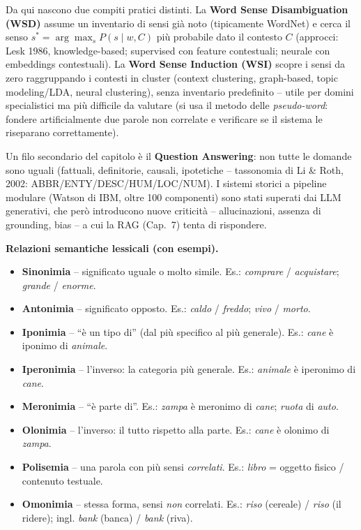 \documentclass[11pt,a4paper]{article}
\begin{document}
Da qui nascono due compiti pratici distinti. La \textbf{Word Sense Disambiguation (WSD)} assume un inventario di sensi gi\`a noto (tipicamente WordNet) e cerca il senso $s^*=\arg\max_s P(s\mid w,C)$ pi\`u probabile dato il contesto $C$ (approcci: Lesk 1986, knowledge-based; supervised con feature contestuali; neurale con embeddings contestuali). La \textbf{Word Sense Induction (WSI)} scopre i sensi da zero raggruppando i contesti in cluster (context clustering, graph-based, topic modeling/LDA, neural clustering), senza inventario predefinito -- utile per domini specialistici ma pi\`u difficile da valutare (si usa il metodo delle \emph{pseudo-word}: fondere artificialmente due parole non correlate e verificare se il sistema le riseparano correttamente).

Un filo secondario del capitolo \`e il \textbf{Question Answering}: non tutte le domande sono uguali (fattuali, definitorie, causali, ipotetiche -- tassonomia di Li \& Roth, 2002: ABBR/ENTY/DESC/HUM/LOC/NUM). I sistemi storici a pipeline modulare (Watson di IBM, oltre 100 componenti) sono stati superati dai LLM generativi, che per\`o introducono nuove criticit\`a -- allucinazioni, assenza di grounding, bias -- a cui la RAG (Cap.~7) tenta di rispondere.

\medskip\noindent\textbf{\textcolor{blue!45!black}{Relazioni semantiche lessicali (con esempi).}}
\begin{itemize}
\item \textbf{Sinonimia} -- significato uguale o molto simile. Es.: \emph{comprare} / \emph{acquistare}; \emph{grande} / \emph{enorme}.
\item \textbf{Antonimia} -- significato opposto. Es.: \emph{caldo} / \emph{freddo}; \emph{vivo} / \emph{morto}.
\item \textbf{Iponimia} -- ``\`e un tipo di'' (dal pi\`u specifico al pi\`u generale). Es.: \emph{cane} \`e iponimo di \emph{animale}.
\item \textbf{Iperonimia} -- l'inverso: la categoria pi\`u generale. Es.: \emph{animale} \`e iperonimo di \emph{cane}.
\item \textbf{Meronimia} -- ``\`e parte di''. Es.: \emph{zampa} \`e meronimo di \emph{cane}; \emph{ruota} di \emph{auto}.
\item \textbf{Olonimia} -- l'inverso: il tutto rispetto alla parte. Es.: \emph{cane} \`e olonimo di \emph{zampa}.
\item \textbf{Polisemia} -- una parola con pi\`u sensi \emph{correlati}. Es.: \emph{libro} = oggetto fisico / contenuto testuale.
\item \textbf{Omonimia} -- stessa forma, sensi \emph{non} correlati. Es.: \emph{riso} (cereale) / \emph{riso} (il ridere); ingl. \emph{bank} (banca) / \emph{bank} (riva).
\end{itemize}
\end{document}

